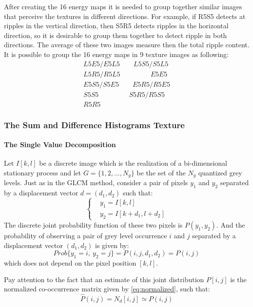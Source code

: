 After creating the 16 energy maps it is needed to group together similar images that perceive the textures in different directions. For example, if R5S5 detects at ripples in the vertical direction, then S5R5 detects ripples in the horizontal direction, so it is desirable to group them together to detect ripple in both directions. The average of these two images measure then the total ripple content. It is possible to group the 16 energy maps in 9 texture images as following:
\begin{align*}
L5E5/E5L5\qquad L5S5/S5L5\\
L5R5/R5L5\qquad\qquad\ \ E5E5\\
E5S5/S5E5\qquad E5R5/R5E5\\
S5S5\qquad\qquad\ \ S5R5/R5S5\\
R5R5
\end{align*}


\subsubsection{The Sum and Difference Histograms Texture}
\label{sec:sum_and_diff_hist_texture}
\paragraph{The Single Value Decomposition}
Let $I[k,l]$ be a discrete image which is the realization of a bi-dimensional stationary process and let $G=\{1, 2,...,N_g\}$ be the set of the $N_g$ quantized grey levels.
Just as in the GLCM method, consider a pair of pixels $y_1$ and $y_2$ separated by a displacement vector $d = (d_1, d_2)$ such that:
\begin{equation}
\begin{cases}
&y_1 = I[k,l]\\
&y_2 = I[k+d_1, l+d_2]
\end{cases}
\end{equation}
The discrete joint probability function of these two pixels is $P(y_1, y_2)$. And the probability of observing a pair of grey level occurrence $i$ and $j$ separated by a displacement vector $(d_1, d_2)$ is given by:
\begin{equation}
    Prob\{y_1=i,\  y_2=j\} = P(i,j,d_1,d_2) = P(i,j)
\end{equation}
which does not depend on the pixel position $[k,l]$.

Pay attention to the fact that an estimate of this joint distribution $P[i,j]$ is the normalized co-occurrence matrix given by \ref{eq:normalized}, such that:
\begin{equation}
    \hat{P}(i,j) = N_d[i,j] \simeq P(i,j)
\end{equation}
\newline

